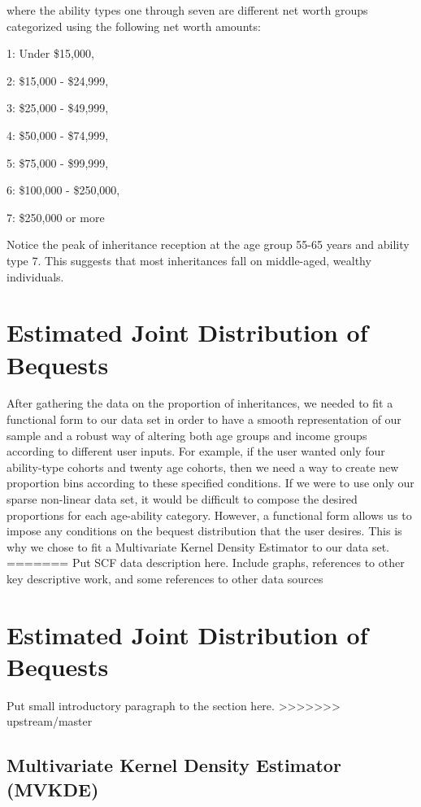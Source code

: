 \documentclass[letterpaper,12pt]{article}
\theoremstyle{definition}
\begin{document}
\begin{spacing}{1.5}
where the ability types one through seven are different net worth groups categorized using the following
net worth amounts:

1: Under \$15,000,

2: \$15,000 - \$24,999,

3: \$25,000 - \$49,999,

4: \$50,000 - \$74,999,

5: \$75,000 - \$99,999,

6: \$100,000 - \$250,000,

7: \$250,000 or more

Notice the peak of inheritance reception at the age group 55-65 years and ability type 7. This suggests that most inheritances fall on middle-aged, wealthy individuals.

\section{Estimated Joint Distribution of Bequests}\label{SecDist}

  After gathering the data on the proportion of inheritances, we needed to fit a functional form to our data set in order to have a smooth representation of our sample and a robust way of altering both age groups and income groups according to different user inputs. For example, if the user wanted only four ability-type cohorts and twenty age cohorts, then we need a way to create new proportion bins according to these specified conditions. If we were to use only our sparse non-linear data set, it would be difficult to compose the desired proportions for each age-ability category. However, a functional form allows us to impose any conditions on the bequest distribution that the user desires. This is why we chose to fit a Multivariate Kernel Density Estimator to our data set. 
=======
  Put SCF data description here. Include graphs, references to other key descriptive work, and some references to other data sources


\section{Estimated Joint Distribution of Bequests}\label{SecDist}

  Put small introductory paragraph to the section here.
>>>>>>> upstream/master


  \subsection{Multivariate Kernel Density Estimator (MVKDE)}\label{SecDistMVKDE}


\end{spacing}
\end{document}
